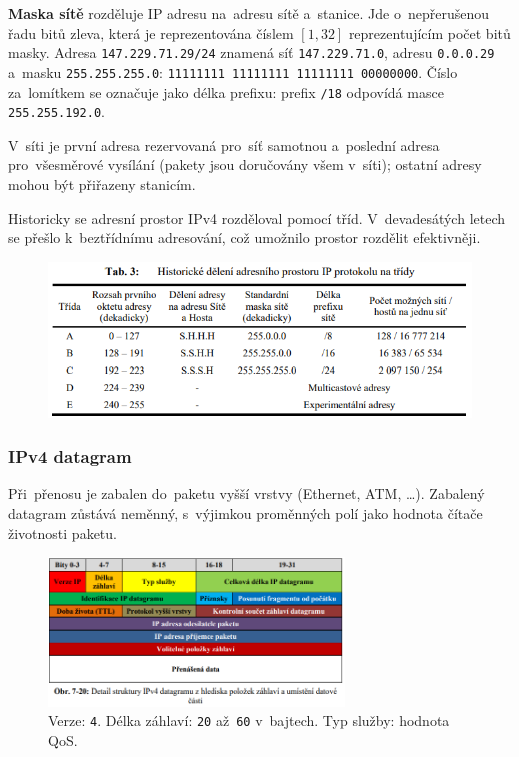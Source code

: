 \textbf{Maska sítě} rozděluje IP adresu na~adresu sítě a~stanice. Jde o~nepřerušenou řadu bitů zleva, která je reprezentována číslem $[1, 32]$ reprezentujícím počet bitů masky. Adresa \texttt{147.229.71.29/24} znamená síť \texttt{147.229.71.0}, adresu \texttt{0.0.0.29} a~masku \texttt{255.255.255.0}: \texttt{11111111 11111111 11111111 00000000}. Číslo za~lomítkem se označuje jako délka prefixu: prefix \texttt{/18} odpovídá masce \texttt{255.255.192.0}.

V~síti je první adresa rezervovaná pro~síť samotnou a~poslední adresa pro~všesměrové vysílání (pakety jsou doručovány všem v~síti); ostatní adresy mohou být přiřazeny stanicím.

Historicky se adresní prostor IPv4 rozděloval pomocí tříd. V~devadesátých letech se přešlo k~beztřídnímu adresování, což umožnilo prostor rozdělit efektivněji.

\begin{figure}
	\centering
	\includegraphics[width=\textwidth]{images/q07_ip_classes}
\end{figure}

\subsubsection{IPv4 datagram}

Při~přenosu je zabalen do~paketu vyšší vrstvy (Ethernet, ATM, \dots). Zabalený datagram zůstává neměnný, s~výjimkou proměnných polí jako hodnota čítače životnosti paketu.

\begin{figure}
	\centering
	\includegraphics[width=0.7\textwidth]{images/q07_ip_packet}
	\caption*{Verze: \texttt{4}. Délka záhlaví: \texttt{20} až~\texttt{60} v~bajtech. Typ služby: hodnota QoS. }
\end{figure}

